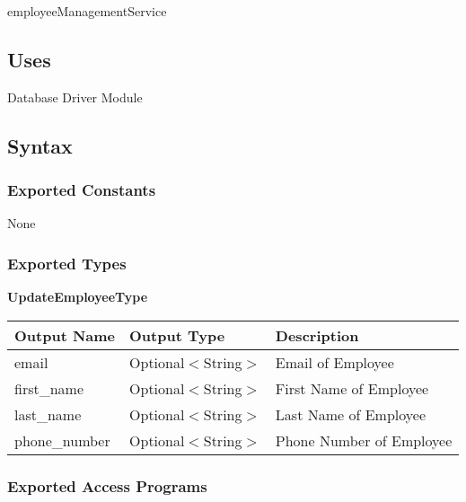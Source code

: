 \documentclass[12pt, titlepage]{article}
\begin{document}
employeeManagementService

\subsection{Uses}

Database Driver Module

\subsection{Syntax}

\subsubsection{Exported Constants}

None

\subsubsection{Exported Types}

\textbf{UpdateEmployeeType}

\begin{table}[H]
	\begin{tabular}{|l|l|l|}
		\hline
		\textbf{Output Name} & \textbf{Output Type} & \textbf{Description}           \\
		\hline
		email                & Optional$<$String$>$ & Email of Employee              \\
		\hline
		first\_name          & Optional$<$String$>$ & First Name of Employee         \\
		\hline
		last\_name           & Optional$<$String$>$ & Last Name of Employee          \\
		\hline
		phone\_number        & Optional$<$String$>$ & Phone Number of Employee       \\
		\hline
	\end{tabular}
\end{table}

\subsubsection{Exported Access Programs}
\end{document}
